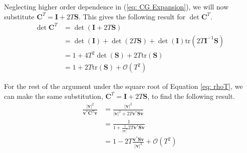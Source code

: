 \documentclass[onecolumn,3p]{elsarticle}
\begin{document}
	Neglecting higher order dependence in  (\ref{eq: CG Expansion}), we will now substitute \(\mathbf{C}^T   = \mathbf{I} +2T\mathbf{S} \). This gives the following result for \(\det \mathbf{C}^T \).
	\begin{equation}
	\begin{aligned}
	\det \mathbf{C}^T &= \det(\mathbf{I} +2T\mathbf{S}) \\
	&= \det(\mathbf{I} ) + \det(2T\mathbf{S}) + \det(\mathbf{I}) \text{tr} (2T\mathbf{I} ^{-1}\mathbf{S}) \\
	&= 1 + 4T^2\det(\mathbf{S}) + 2T\text{tr}(\mathbf{S}) \\
	&= 1 + 2T\text{tr}(\mathbf{S}) + \mathcal{O}(T^2)
	\end{aligned}
	\end{equation}
	
	For the rest of the argument under the square root of Equation \ref{eq: rhoT}, we can make the same substitution, \(\mathbf{C}^T   = \mathbf{I} +2T\mathbf{S} \), to find the following result.
	\begin{equation}
	\begin{aligned}
	\frac{\left|\mathbf{v}\right|^2}{\mathbf{v}^* \mathbf{C}^T\mathbf{v}} &= \frac{\left|\mathbf{v}\right|^2}{\left|\mathbf{v}\right|^2+2T \mathbf{v}^*\mathbf{S}\mathbf{v}} \\
	&= \frac{1}{1+\frac{1}{\left|\mathbf{v}\right|^2}2T\mathbf{v}^*\mathbf{S}\mathbf{v}} \\
	&= 1-2T \frac{\mathbf{v}^* \mathbf{S}\mathbf{v}}{\left|\mathbf{v}\right|^2} + \mathcal{O}(T^2)
	\end{aligned}
	\end{equation}
	
\end{document}
